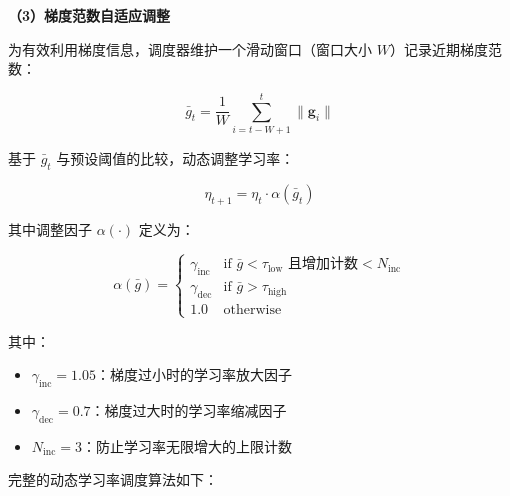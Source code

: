 \documentclass[UTF8, a4paper, 12pt]{article}
\begin{document}
\textbf{（3）梯度范数自适应调整}

为有效利用梯度信息，调度器维护一个滑动窗口（窗口大小 $W$）记录近期梯度范数：

\begin{equation}
\bar{g}_t = \frac{1}{W} \sum_{i=t-W+1}^{t} \|\mathbf{g}_i\|
\end{equation}

基于 $\bar{g}_t$ 与预设阈值的比较，动态调整学习率：

\begin{equation}
\eta_{t+1} = \eta_t \cdot \alpha(\bar{g}_t)
\end{equation}

其中调整因子 $\alpha(\cdot)$ 定义为：

\begin{equation}
\alpha(\bar{g}) = \begin{cases}
\gamma_{\text{inc}} & \text{if } \bar{g} < \tau_{\text{low}} \text{ 且增加计数} < N_{\text{inc}} \\
\gamma_{\text{dec}} & \text{if } \bar{g} > \tau_{\text{high}} \\
1.0 & \text{otherwise}
\end{cases}
\end{equation}

其中：
\begin{itemize}
    \item $\gamma_{\text{inc}} = 1.05$：梯度过小时的学习率放大因子
    \item $\gamma_{\text{dec}} = 0.7$：梯度过大时的学习率缩减因子
    \item $N_{\text{inc}} = 3$：防止学习率无限增大的上限计数
\end{itemize}


完整的动态学习率调度算法如下：
\end{document}
